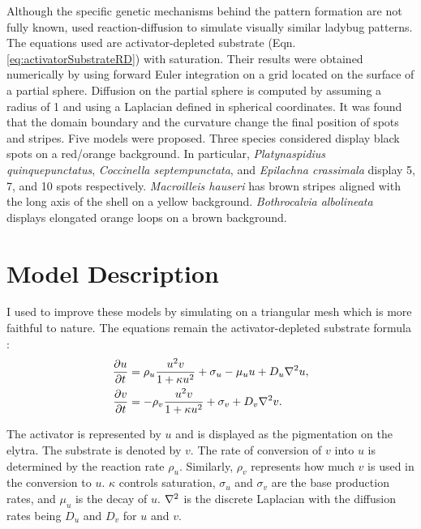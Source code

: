 Although the specific genetic mechanisms behind the pattern formation are not fully known, \citet{liaw2001} used reaction-diffusion to simulate visually similar ladybug patterns. The equations used are activator-depleted substrate (Eqn. \ref{eq:activatorSubstrateRD}) with saturation. Their results were obtained numerically by using forward Euler integration on a grid located on the surface of a partial sphere. Diffusion on the partial sphere is computed by assuming a radius of 1 and using a Laplacian defined in spherical coordinates. It was found that the domain boundary and the curvature change the final position of spots and stripes. Five models were proposed. Three species considered display black spots on a red/orange background. In particular, \textit{Platynaspidius quinquepunctatus}, \textit{Coccinella septempunctata}, and \textit{Epilachna crassimala} display 5, 7, and 10 spots respectively. \textit{Macroilleis hauseri} has brown stripes aligned with the long axis of the shell on a yellow background. \textit{Bothrocalvia albolineata} displays elongated orange loops on a brown background.

\section{Model Description} 
I used \ProgramName{} to improve these models by simulating on a triangular mesh which is more faithful to nature. The equations remain the activator-depleted substrate formula \citep{meinhardt1982}:
\begin{equation}
	\begin{aligned} \label{eq:ladybugRD}
   \frac{\partial u}{\partial t} &= \rho_u \frac{u^2v}{1+\kappa u^2} + \sigma_u - \mu_u u + D_u \nabla^2 u, \\
   \frac{\partial v}{\partial t} &= -\rho_v \frac{u^2v}{1+\kappa u^2} + \sigma_v + D_v \nabla^2 v.
	\end{aligned}
\end{equation}

The activator is represented by $u$ and is displayed as the pigmentation on the elytra. The substrate is denoted by $v$. The rate of conversion of $v$ into $u$ is determined by the reaction rate $\rho_u$. Similarly, $\rho_v$ represents how much $v$ is used in the conversion to $u$. $\kappa$ controls saturation, $\sigma_u$ and $\sigma_v$ are the base production rates, and $\mu_u$ is the decay of $u$. $\nabla^2$ is the discrete Laplacian with the diffusion rates being $D_u$ and $D_v$ for $u$ and $v$.

